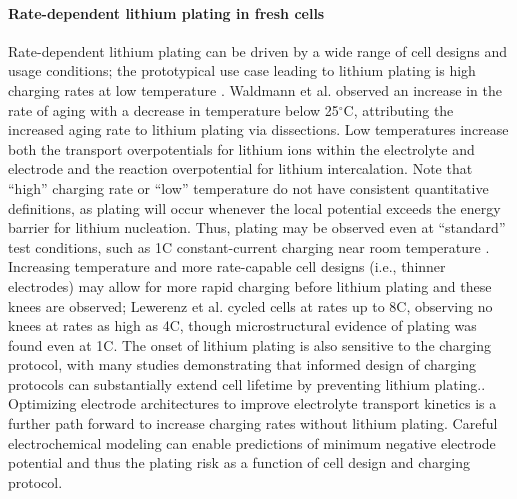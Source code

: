 \documentclass[journal=jpclcd,manuscript=article]{achemso}
\begin{document}
\paragraph{Rate-dependent lithium plating in fresh cells}
Rate-dependent lithium plating can be driven by a wide range of cell designs and usage conditions; the prototypical use case leading to lithium plating is high charging rates at low temperature \cite{waldmann_temperature_2014, petzl_lithium_2015}. Waldmann et al.\cite{waldmann_temperature_2014} observed an increase in the rate of aging with a decrease in temperature below 25$^{\circ}$C, attributing the increased aging rate to lithium plating via dissections. Low temperatures increase both the transport overpotentials for lithium ions within the electrolyte and electrode and the reaction overpotential for lithium intercalation. Note that ``high'' charging rate or ``low'' temperature do not have consistent quantitative definitions, as plating will occur whenever the local potential exceeds the energy barrier for lithium nucleation. Thus, plating may be observed even at ``standard'' test conditions, such as 1C constant-current charging near room temperature \cite{waldmann_optimization_2015,burns_-situ_2015}. Increasing temperature and more rate-capable cell designs (i.e., thinner electrodes) may allow for more rapid charging before lithium plating and these knees are observed\cite{yang_understanding_2018, coron_impact_2020}; Lewerenz et al.\cite{lewerenz_systematic_2017} cycled cells at rates up to 8C, observing no knees at rates as high as 4C, though microstructural evidence of plating was found even at 1C. The onset of lithium plating is also sensitive to the charging protocol, with many studies demonstrating that informed design of charging protocols can substantially extend cell lifetime by preventing lithium plating.\cite{waldmann_optimization_2015,schindler_fast_2018, attia_closed-loop_2020}. Optimizing electrode architectures to improve electrolyte transport kinetics is a further path forward to increase charging rates without lithium plating.\cite{nemani_design_2015, usseglio-viretta_enabling_2020}
Careful electrochemical modeling can enable predictions of minimum negative electrode potential and thus the plating risk as a function of cell design and charging protocol.\cite{yang_understanding_2018}
\end{document}
